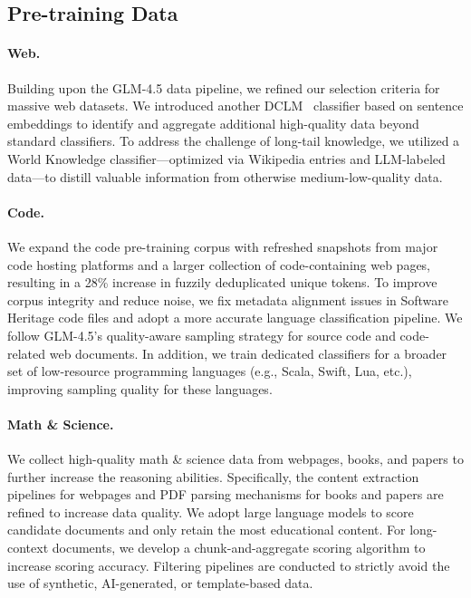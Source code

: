 \documentclass{article}
\theoremstyle{definition}
\begin{document}
\subsection{Pre-training Data}

\paragraph{Web.} Building upon the GLM-4.5 data pipeline, we refined our selection criteria for massive web datasets. We introduced another DCLM~\cite{li2025datacomplmsearchgenerationtraining} classifier based on sentence embeddings to identify and aggregate additional high-quality data beyond standard classifiers. To address the challenge of long-tail knowledge, we utilized a World Knowledge classifier—optimized via Wikipedia entries and LLM-labeled data—to distill valuable information from otherwise medium-low-quality data.

\paragraph{Code.} We expand the code pre-training corpus with refreshed snapshots from major code hosting platforms and a larger collection of code-containing web pages, resulting in a 28\% increase in fuzzily deduplicated unique tokens. To improve corpus integrity and reduce noise, we fix metadata alignment issues in Software Heritage code files and adopt a more accurate language classification pipeline. We follow GLM-4.5’s quality-aware sampling strategy for source code and code-related web documents. In addition, we train dedicated classifiers for a broader set of low-resource programming languages (e.g., Scala, Swift, Lua, etc.), improving sampling quality for these languages.

\paragraph{Math \& Science.} We collect high-quality math \& science data from webpages, books, and papers to further increase the reasoning abilities. Specifically, the content extraction pipelines for webpages and PDF parsing mechanisms
for books and papers are refined to increase data quality. We adopt large language models to score candidate documents and only retain the most educational content. For long-context documents, we develop a chunk-and-aggregate scoring algorithm to increase scoring accuracy. Filtering pipelines are conducted to strictly avoid the use of synthetic, AI-generated, or template-based data. 
\end{document}
